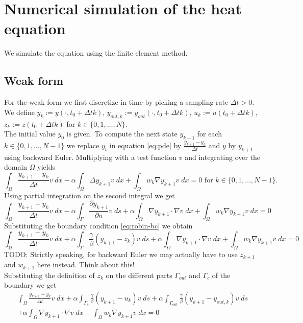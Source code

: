 \documentclass[
12pt, %
a4paper, %
onecolumn, %
portrait %
]{article}
\begin{document}
\section{Numerical simulation of the heat equation}
We simulate the equation using the finite element method.
\subsection{Weak form}
For the weak form we first discretize in time by picking a sampling rate $\Delta t > 0$. We define $y_k := y(\cdot, t_0 + \Delta t k)$, $y_{out,k} := y_{out}(\cdot, t_0 + \Delta t k) $, $u_k := u(t_0 + \Delta t k)$, $z_k := z(t_0 + \Delta t k)$ for $k \in \{0, 1, \hdots, N\}$. \\
The initial value $y_0$ is given. To compute the next state $y_{k+1}$ for each $k \in \{0, 1, \hdots, N-1\}$  we replace $y_t$ in equation \eqref{eq:pde} by $\frac{y_{k+1} - y_k}{\Delta t}$ and $y$ by $y_{k+1}$ using backward Euler. Multiplying with a test function $v$ and integrating over the domain $\Omega$ yields
\begin{equation}
\int_{\Omega} \frac{y_{k+1} - y_k}{\Delta t} v \; dx - \alpha \int_{\Omega} \Delta y_{k+1} v \; dx + \int_{\Omega} w_{k} \nabla y_{k+1} v \; dx = 0 \text{ for } k \in \{0, 1, \hdots, N-1\}.
\end{equation}
Using partial integration on the second integral we get
\begin{equation}
\int_{\Omega} \frac{y_{k+1} - y_k}{\Delta t} v \; dx - \alpha \int_{\Gamma}  \frac{\partial y_{k+1}}{\partial n} v \; ds + \alpha \int_{\Omega} \nabla y_{k+1} \cdot \nabla v \; dx + \int_{\Omega} w_{k} \nabla y_{k+1} v \; dx = 0
\end{equation}
Substituting the boundary condition \eqref{eq:robin-bc} we obtain
\begin{equation}
\int_{\Omega} \frac{y_{k+1} - y_k}{\Delta t} v \; dx + \alpha \int_{\Gamma} \frac{ \gamma}{\beta}  (y_{k+1} - z_k) v \; ds + \alpha \int_{\Omega} \nabla y_{k+1} \cdot \nabla v \; dx + \int_{\Omega} w_{k} \nabla y_{k+1} v \; dx = 0
\end{equation}
TODO: Strictly speaking, for backward Euler we may actually have to use $z_{k+1}$ and $w_{k+1}$ here instead. Think about this!\\
Substituting the definition of $z_k$ on the different parts $\Gamma_{out}$ and $\Gamma_c$ of the boundary we get
\begin{equation}
\begin{aligned}
\int_{\Omega} \frac{y_{k+1} - y_k}{\Delta t} v \; dx +  \alpha \int_{\Gamma_c} \frac{\gamma}{\beta}  (y_{k+1} - u_k) v \; ds  +  \alpha\int_{\Gamma_{out}} \frac{ \gamma}{\beta}  (y_{k+1} - y_{out,k}) v \; ds \\
+ \alpha \int_{\Omega} \nabla y_{k+1} \cdot \nabla v \; dx + \int_{\Omega} w_{k} \nabla y_{k+1} v \; dx = 0
\label{eq:fem-state-equation}
\end{aligned}
\end{equation}
\end{document}
